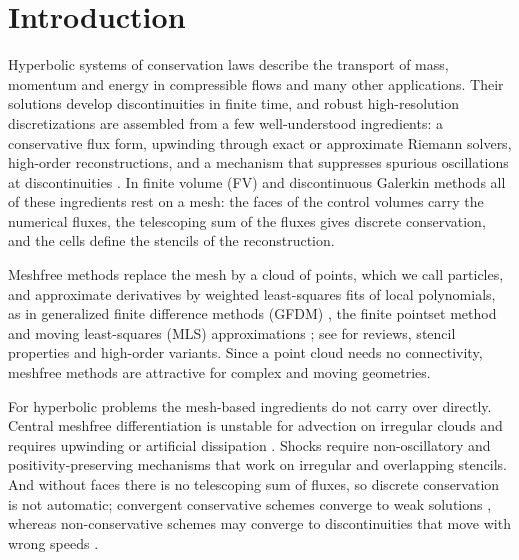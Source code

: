 \documentclass[smallextended]{svjour3}
\numberwithin{equation}{section}
\begin{document}
\section{Introduction}\label{sec:intro}

Hyperbolic systems of conservation laws describe the transport of mass, momentum and energy in compressible flows and many other applications. Their solutions develop discontinuities in finite time, and robust high-resolution discretizations are assembled from a few well-understood ingredients: a conservative flux form, upwinding through exact or approximate Riemann solvers, high-order reconstructions, and a mechanism that suppresses spurious oscillations at discontinuities \cite{vanLeer1979,Harten1987,Shu1998,Toro2009}. In finite volume (FV) and discontinuous Galerkin methods all of these ingredients rest on a mesh: the faces of the control volumes carry the numerical fluxes, the telescoping sum of the fluxes gives discrete conservation, and the cells define the stencils of the reconstruction.

Meshfree methods replace the mesh by a cloud of points, which we call particles, and approximate derivatives by weighted least-squares fits of local polynomials, as in generalized finite difference methods (GFDM) \cite{Jensen1972,Perrone1975,Liszka1980,Benito2001,Benito2007}, the finite pointset method \cite{Tiwari2003} and moving least-squares (MLS) approximations \cite{Lancaster1981,Levin1998}; see \cite{Belytschko1996,Nguyen2008,Seibold2006,Clain2024} for reviews, stencil properties and high-order variants. Since a point cloud needs no connectivity, meshfree methods are attractive for complex and moving geometries.

For hyperbolic problems the mesh-based ingredients do not carry over directly. Central meshfree differentiation is unstable for advection on irregular clouds and requires upwinding or artificial dissipation \cite{FornbergLehto2011,Willems2025}. Shocks require non-oscillatory and positivity-preserving mechanisms that work on irregular and overlapping stencils. And without faces there is no telescoping sum of fluxes, so discrete conservation is not automatic; convergent conservative schemes converge to weak solutions \cite{LaxWendroff1960}, whereas non-conservative schemes may converge to discontinuities that move with wrong speeds \cite{HouLeFloch1994}.
\end{document}
